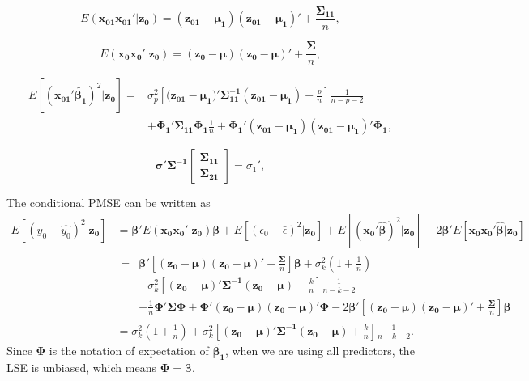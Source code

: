\begin{equation}\label{LemmaA3}
E(\boldsymbol{x_{01}x_{01}'}|\boldsymbol{z_0})=(\boldsymbol{z_{01}}-\boldsymbol{\mu_1})(\boldsymbol{z_{01}}-\boldsymbol{\mu_1})'+\frac{\boldsymbol{\Sigma_{11}}}{n},
\end{equation}

\begin{equation}\label{LemmaA3.1}
E(\boldsymbol{x_0x_0'}|\boldsymbol{z_0})=(\boldsymbol{z_0-\mu})(\boldsymbol{z_0}-\boldsymbol{\mu})'+\frac{\boldsymbol{\Sigma}}{n},
\end{equation}

\begin{equation}
\begin{aligned}
\label{LemmaA7}
E[(\boldsymbol{x_{01}'\tilde{\beta_1}})^2|\boldsymbol{z_0}]
=&\sigma_p^2 \left[(\boldsymbol{z_{01}-\mu_1)'\Sigma_{11}^{-1}(z_{01}-\mu_1)}+\frac{p}{n}\right]\frac{1}{n-p-2}\\
&+\boldsymbol{\Phi_1'\Sigma_{11}\Phi_1}\frac{1}{n}+\boldsymbol{\Phi_{1}'(z_{01}-\mu_{1})(z_{01}-\mu_1)'\Phi_1},
\end{aligned}\end{equation}

\begin{equation}\label{LemmaA9}
\boldsymbol{\sigma'\Sigma^{-1}}
\begin{bmatrix}
\boldsymbol{\Sigma_{11}}\\ \boldsymbol{\Sigma_{21}}\end{bmatrix}=\sigma_1',
\end{equation}


The conditional PMSE can be written as
$$\begin{aligned}
E[(y_0-\hat{y_0})^2|\boldsymbol{z_0}]
&=\boldsymbol{\beta'}E(\boldsymbol{x_0x_0'}|\boldsymbol{z_0})\boldsymbol{\beta}+E[(\epsilon_0-\bar{\epsilon})^2|\boldsymbol{z_0}]+E[(\boldsymbol{x_0'\hat{\beta}})^2|\boldsymbol{z_0}]-2\boldsymbol{\beta'}E[\boldsymbol{x_0x_0'\hat{\beta}}|\boldsymbol{z_0}]\\
&\begin{aligned}=&\boldsymbol{\beta}' \left[\boldsymbol{(z_0-\mu)(z_0-\mu)'}+\frac{\boldsymbol{\Sigma}}{n} \right]\boldsymbol{\beta}+\sigma_k^2 \left(1+\frac{1}{n}\right)\\
&+\sigma_{k}^2 \left[\boldsymbol{(z_0-\mu)'\Sigma^{-1}(z_0-\mu)}+\frac{k}{n} \right]\frac{1}{n-k-2}\\
&+\frac{1}{n}\boldsymbol{\Phi'\Sigma\Phi}+\boldsymbol{\Phi'(z_{0}-\mu)(z_{0}-\mu)'\Phi}-2\boldsymbol{\beta'}\left[\boldsymbol{(z_0-\mu)(z_0-\mu)'}+\frac{\boldsymbol{\Sigma}}{n} \right]\boldsymbol{\beta}
\end{aligned}\\
&=\sigma_k^2\left(1+\frac{1}{n}\right)+\sigma_k^2 \left[\boldsymbol{(z_0-\mu)'\Sigma^{-1}(z_0-\mu)}+\frac{k}{n} \right]\frac{1}{n-k-2}.
\end{aligned}$$
Since $\boldsymbol{\Phi}$ is the notation of expectation of $\boldsymbol{\tilde{\beta_1}}$, when we are using all predictors, the LSE is unbiased, which means $\boldsymbol{\Phi} = \boldsymbol{\beta}$. 

